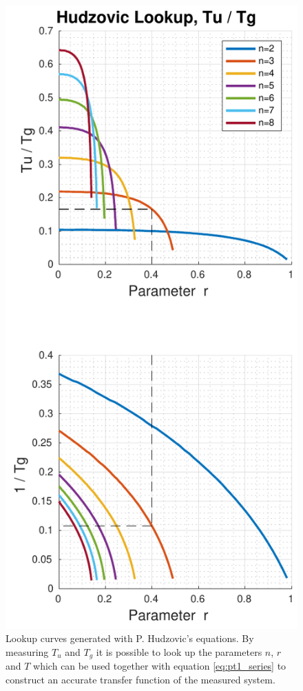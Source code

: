 \begin{figure}
    \centering
    \includegraphics[width=\imagewidth]{images/hudzovic_curves_tu_tg.pdf}
    \caption{Lookup curves generated with P. Hudzovic's equations. By measuring $T_u$ and $T_g$ it is possible to look up the parameters $n$, $r$ and $T$ which can be used together with equation \ref{eq:pt1_series} to construct an accurate transfer function of the measured system.}
    \label{fig:hudzovic}
\end{figure}

